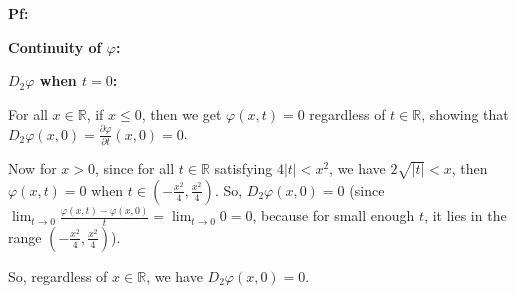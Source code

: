 \documentclass{article}
\begin{document}
\textbf{Pf:}

\textbf{Continuity of $\varphi$:}

\hfil

\textbf{$D_2\varphi$ when $t=0$:}

For all $x\in\mathbb{R}$, if $x\leq 0$, then we get $\varphi(x,t)=0$ regardless of $t\in\mathbb{R}$, showing that $D_2\varphi(x,0) = \frac{\partial \varphi}{\partial t}(x,0) = 0$.

Now for $x> 0$, since for all $t\in\mathbb{R}$ satisfying $4|t|<x^2$, we have $2\sqrt{|t|}<x$, then $\varphi(x,t)=0$ when $t\in (-\frac{x^2}{4},\frac{x^2}{4})$. So, $D_2\varphi(x,0)=0$ (since $\lim_{t\rightarrow 0}\frac{\varphi(x,t)-\varphi(x,0)}{t} = \lim_{t\rightarrow 0}0 = 0$, because for small enough $t$, it lies in the range $(-\frac{x^2}{4},\frac{x^2}{4})$).

So, regardless of $x\in\mathbb{R}$, we have $D_2\varphi(x,0)=0$.

\hfil



\break
\end{document}
